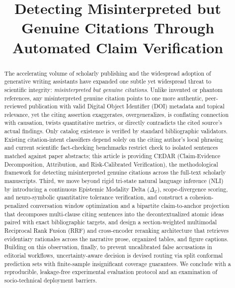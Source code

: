\documentclass[journal]{IEEEtran}
\begin{document}
\title{Detecting Misinterpreted but Genuine Citations Through Automated Claim Verification}

\author{
}

\maketitle

\begin{abstract}
The accelerating volume of scholarly publishing and the widespread adoption of generative writing assistants have expanded one subtle yet widespread threat to scientific integrity: \emph{misinterpreted but genuine citations}. Unlike invented or phantom references, any misinterpreted genuine citation points to one more authentic, peer-reviewed publication with valid Digital Object Identifier (DOI) metadata and topical relevance, yet the citing assertion exaggerates, overgeneralizes, is conflating connection with causation, twists quantitative metrics, or directly contradicts the cited source's actual findings. Only catalog existence is verified by standard bibliographic validators. Existing citation-intent classifiers depend solely on the citing author's local phrasing and current scientific fact-checking benchmarks restrict check to isolated sentences matched against paper abstracts; this article is providing CEDAR (Claim-Evidence Decomposition, Attribution, and Risk-Calibrated Verification), the methodological framework for detecting misinterpreted genuine citations across the full-text scholarly manuscripts. Third, we move beyond rigid tri-state natural language inference (NLI) by introducing a continuous Epistemic Modality Delta ($\Delta_{\mathcal{E}}$), scope-divergence scoring, and neuro-symbolic quantitative tolerance verification, and construct a cohesion-penalized conversation window optimization and a bipartite claim-to-anchor projection that decomposes multi-clause citing sentences into the decontextualized atomic ideas paired with exact bibliographic targets, and design a section-weighted multimodal Reciprocal Rank Fusion (RRF) and cross-encoder reranking architecture that retrieves evidentiary rationales across the narrative prose, organized tables, and figure captions. Building on this observation, finally, to prevent uncalibrated false accusations in editorial workflows, uncertainty-aware decision is devised routing via split conformal prediction sets with finite-sample insignificant coverage guarantees. We conclude with a reproducible, leakage-free experimental evaluation protocol and an examination of socio-technical deployment barriers.
\end{abstract}
\end{document}

